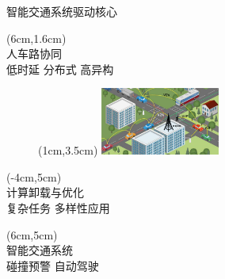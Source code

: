 \begin{frame}{智能交通系统驱动核心}
\begin{center}
\begin{textblock*}{\textwidth}(6cm,1.6cm)
\\ \footnotesize 人车路协同\\
\scriptsize 低时延 \hspace{1em} 分布式 \hspace{1em} 高异构
\end{textblock*}
\end{center}
  
  \begin{center}
  	\begin{figure}
  		\begin{textblock*}{\textwidth}(1cm,3.5cm)
    \includegraphics[width=0.35\textwidth]{fig/v2x.pdf}
  		\end{textblock*}
	\end{figure}
  \end{center}
  
\begin{center}
\begin{textblock*}{\textwidth}(-4cm,5cm)
\\\footnotesize 计算卸载与优化\\
\scriptsize 复杂任务 \hspace{1em} 多样性应用
\end{textblock*}
\end{center}

\begin{center}
\begin{textblock*}{\textwidth}(6cm,5cm)
\\ \footnotesize 智能交通系统\\
\scriptsize 碰撞预警 \hspace{1em} 自动驾驶
\end{textblock*}
\end{center}
\end{frame}

